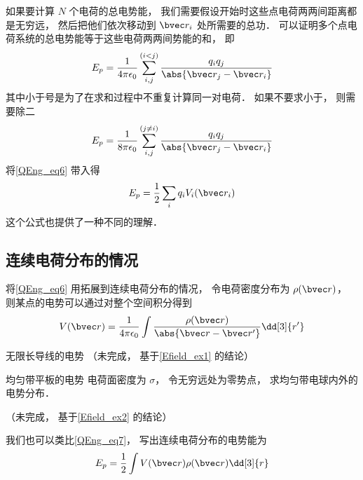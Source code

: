 如果要计算 $N$ 个电荷的总电势能， 我们需要假设开始时这些点电荷两两间距离都是无穷远， 然后把他们依次移动到 $\bvec r_i$ 处所需要的总功． 可以证明多个点电荷系统的总电势能等于这些电荷两两间势能的和， 即
\begin{equation}
E_p = \frac{1}{4\pi\epsilon_0} \sum_{i,j}^{(i < j)} \frac{q_i q_j}{\abs{\bvec r_j - \bvec r_i}}
\end{equation}
其中小于号是为了在求和过程中不重复计算同一对电荷． 如果不要求小于， 则需要除二
\begin{equation}
E_p = \frac{1}{8\pi\epsilon_0} \sum_{i, j}^{(j\neq i)} \frac{q_i q_j}{\abs{\bvec r_j - \bvec r_i}}
\end{equation}
将\autoref{QEng_eq6} 带入得
\begin{equation}\label{QEng_eq7}
E_p = \frac12 \sum_i q_i V_i(\bvec r_i)
\end{equation}
这个公式也提供了一种不同的理解．

\subsection{连续电荷分布的情况}
将\autoref{QEng_eq6} 用拓展到连续电荷分布的情况， 令电荷密度分布为 $\rho(\bvec r)$， 则某点的电势可以通过对整个空间积分得到
\begin{equation}
V(\bvec r) = \frac{1}{4\pi\epsilon_0} \int \frac{\rho(\bvec r)}{\abs{\bvec r - \bvec r'}} \dd[3]{r'}
\end{equation}

\begin{example}{无限长导线的电势}
（未完成， 基于\autoref{Efield_ex1} 的结论）
\end{example}

\begin{example}{均匀带平板的电势}
电荷面密度为 $\sigma$， 令无穷远处为零势点， 求均匀带电球内外的电势分布．

（未完成， 基于\autoref{Efield_ex2} 的结论）
\end{example}

我们也可以类比\autoref{QEng_eq7}， 写出连续电荷分布的电势能为
\begin{equation}\label{QEng_eq8}
E_p = \frac 12 \int V(\bvec r) \rho(\bvec r) \dd[3]{r}
\end{equation}

